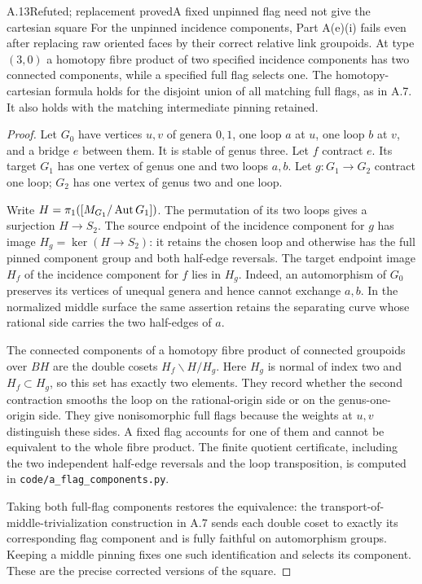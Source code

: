 \begin{result}{A.13}{Refuted; replacement proved}{A fixed unpinned flag need not give the cartesian square}
For the unpinned incidence components, Part A(e)(i) fails even after
replacing raw oriented faces by their correct relative link groupoids.
At type $(3,0)$ a homotopy fibre product of two specified incidence
components has two connected components, while a specified full flag
selects one. The homotopy-cartesian formula holds for the disjoint union
of all matching full flags, as in A.7. It also holds with the matching
intermediate pinning retained.
\end{result}
\begin{proof}
Let $G_0$ have vertices $u,v$ of genera $0,1$, one loop $a$ at $u$,
one loop $b$ at $v$, and a bridge $e$ between them. It is stable of
genus three. Let $f$ contract $e$. Its target $G_1$ has one vertex of
genus one and two loops $a,b$. Let $g:G_1\to G_2$ contract one loop;
$G_2$ has one vertex of genus two and one loop.

Write $H=\pi_1([M_{G_1}/\operatorname{Aut} G_1])$. The permutation of its two
loops gives a surjection $H\to S_2$. The source endpoint of the
incidence component for $g$ has image $H_g=\ker(H\to S_2)$:
it retains the chosen loop and otherwise has the full pinned
component group and both half-edge reversals. The target endpoint
image $H_f$ of the incidence component for $f$ lies in $H_g$.
Indeed, an automorphism of $G_0$ preserves its vertices of unequal
genera and hence cannot exchange $a,b$. In the normalized middle
surface the same assertion retains the separating curve whose
rational side carries the two half-edges of $a$.

The connected components of a homotopy fibre product of connected
groupoids over $BH$ are the double cosets $H_f\backslash H/H_g$.
Here $H_g$ is normal of index two and $H_f\subset H_g$, so this
set has exactly two elements. They record whether the second
contraction smooths the loop on the rational-origin side or on the
genus-one-origin side. They give nonisomorphic full flags because
the weights at $u,v$ distinguish these sides. A fixed flag accounts
for one of them and cannot be equivalent to the whole fibre product.
The finite quotient certificate, including the two independent
half-edge reversals and the loop transposition, is computed in
\texttt{code/a\_flag\_components.py}.

Taking both full-flag components restores the equivalence: the
transport-of-middle-trivialization construction in A.7 sends each
double coset to exactly its corresponding flag component and is
fully faithful on automorphism groups. Keeping a middle pinning
fixes one such identification and selects its component. These
are the precise corrected versions of the square.
\end{proof}


